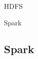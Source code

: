 \documentclass[11pt]{beamer}
\begin{document}
\begin{frame}{HDFS}
\begin{center}
\begin{figure}
\end{figure}
\end{center}
\end{frame}

\begin{frame}{Spark}
\subsection{Spark}


\end{frame}
\end{document}
